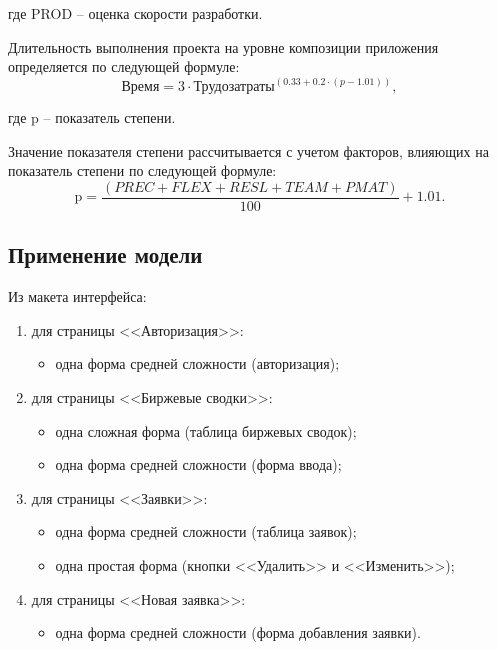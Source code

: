 где PROD -- оценка скорости разработки.

Длительность выполнения проекта на уровне композиции приложения определяется по следующей формуле:
\begin{equation}
    \text{Время} = 3 \cdot \text{Трудозатраты}^{(0.33 + 0.2 \cdot (p - 1.01))},
\end{equation}

где p -- показатель степени. 

Значение показателя степени рассчитывается с учетом факторов, влияющих на показатель степени по следующей формуле:
\begin{equation}
    \text{p} = \frac{(PREC + FLEX + RESL + TEAM + PMAT)}{100} + 1.01.
\end{equation}

\subsection{Применение модели}

Из макета интерфейса:

\begin{enumerate}
    \item для страницы <<Авторизация>>:
        \begin{itemize}
            \item одна форма средней сложности (авторизация);
        \end{itemize}
    \item для страницы <<Биржевые сводки>>:
        \begin{itemize}
            \item одна сложная форма (таблица биржевых сводок);
            \item одна форма средней сложности (форма ввода);
        \end{itemize}
    \item для страницы <<Заявки>>:
        \begin{itemize}
            \item одна форма средней сложности (таблица заявок);
            \item одна простая форма (кнопки <<Удалить>> и <<Изменить>>);
        \end{itemize}
    \item для страницы <<Новая заявка>>:
        \begin{itemize}
            \item одна форма средней сложности (форма добавления заявки).
        \end{itemize}
\end{enumerate}

